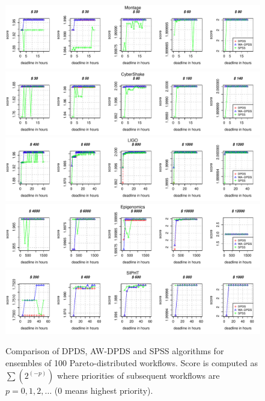 \documentclass{sig-alternate}
\begin{document}
\begin{figure}[htb] 
\centering
\includegraphics[width=1.0\textwidth]{figures/score2-MONTAGE-n-1000-8-dagh1-20m0.pdf}
\includegraphics[width=1.0\textwidth]{figures/score2-CYBERSHAKE-n-1000-8-dagh1-20m0.pdf}
\includegraphics[width=1.0\textwidth]{figures/score2-LIGO-n-1000-8-dagh1-40m0.pdf}
\includegraphics[width=1.0\textwidth]{figures/score2-GENOME-n-1000-8-dagh100-1500m0.pdf}
\includegraphics[width=1.0\textwidth]{figures/score2-SIPHT-n-1000-8-dagh5-50m0.pdf}
\caption{Comparison of DPDS, AW-DPDS and SPSS algorithms for ensembles of 100
Pareto-distributed workflows. Score is computed as $\sum(2^(-p))$ where
priorities of subsequent workflows are $p=0,1,2,\ldots$ (0 means highest
priority).}
\label{fig:}
\end{figure}
\end{document}
